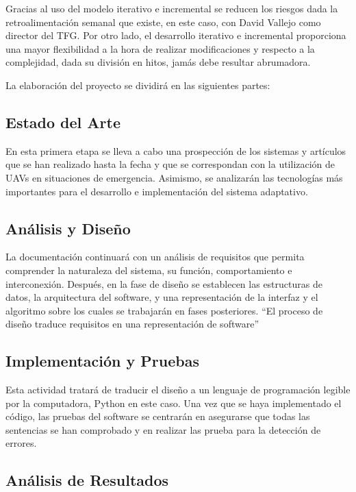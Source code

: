 \documentclass{pre-tfg}
\begin{document}
Gracias al uso del modelo iterativo e incremental se reducen los riesgos dada la retroalimentación semanal que existe, en este caso, con David Vallejo como director del TFG. Por otro lado, el desarrollo iterativo e incremental proporciona una mayor flexibilidad a la hora de realizar modificaciones y respecto a la complejidad, dada su división en hitos, jamás debe resultar abrumadora.

La elaboración del proyecto se dividirá en las siguientes partes:

\subsection{Estado del Arte}

En esta primera etapa se lleva a cabo una prospección de los sistemas y artículos que se han realizado hasta la fecha y que se correspondan con la utilización de UAVs en situaciones de emergencia. Asimismo, se analizarán  las tecnologías más importantes para el desarrollo e implementación del sistema adaptativo.

\subsection{Análisis y Diseño}

La documentación continuará con un análisis de requisitos que permita comprender la naturaleza del sistema, su función, comportamiento e interconexión\cite{pressman}. Después, en la fase de diseño se establecen las estructuras de datos, la arquitectura del software, y una representación de la interfaz y el algoritmo sobre los cuales se trabajarán en fases posteriores. ``El proceso de diseño traduce requisitos en una representación de software''\cite{pressman}

\subsection{Implementación y Pruebas}

Esta actividad tratará de traducir el diseño a un lenguaje de programación legible por la computadora, Python en este caso. Una vez que se haya implementado el código, las pruebas del software se centrarán en asegurarse que todas las sentencias se han comprobado y en realizar las prueba para la detección de errores\cite{pressman}.

\subsection{Análisis de Resultados}
\end{document}
